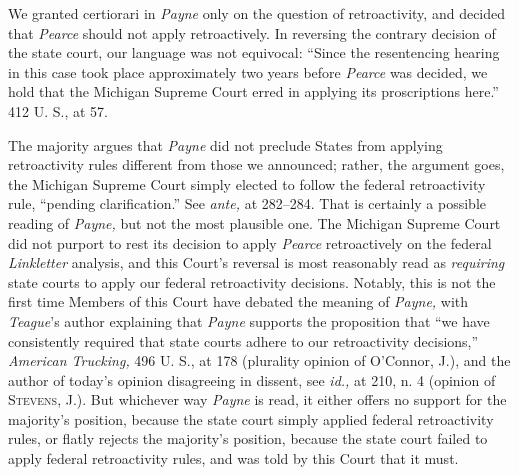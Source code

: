   We granted certiorari in \emph{Payne} only on the question of retroactivity, and decided that \emph{Pearce} should not apply retroactively. In reversing the contrary decision of the state court, our language was not equivocal: ``Since the resentencing hearing in this case took place approximately two years before \emph{Pearce} was decided, we hold that the Michigan Supreme Court erred in applying its proscriptions here.'' 412 U. S., at 57.

  The majority argues that \emph{Payne} did not preclude States from applying retroactivity rules different from those we announced; rather, the argument goes, the Michigan Supreme Court simply elected to follow the federal retroactivity rule, ``pending clarification.'' See \emph{ante,} at 282--284. That is certainly a possible reading of \emph{Payne,} but not the most plausible one. The Michigan Supreme Court did not purport to rest its decision to apply \emph{Pearce} retroactively on the federal \newpage  \emph{Linkletter} analysis, and this Court's reversal is most reasonably read as \emph{requiring} state courts to apply our federal retroactivity decisions. Notably, this is not the first time Members of this Court have debated the meaning of \emph{Payne,} with \emph{Teague}'s author explaining that \emph{Payne} supports the proposition that ``we have consistently required that state courts adhere to our retroactivity decisions,'' \emph{American Trucking,} 496 U. S., at 178 (plurality opinion of O'Connor, J.), and the author of today's opinion disagreeing in dissent, see \emph{id.,} at 210, n. 4 (opinion of \textsc{Stevens,} J.). But whichever way \emph{Payne} is read, it either offers no support for the majority's position, because the state court simply applied federal retroactivity rules, or flatly rejects the majority's position, because the state court failed to apply federal retroactivity rules, and was told by this Court that it must.


